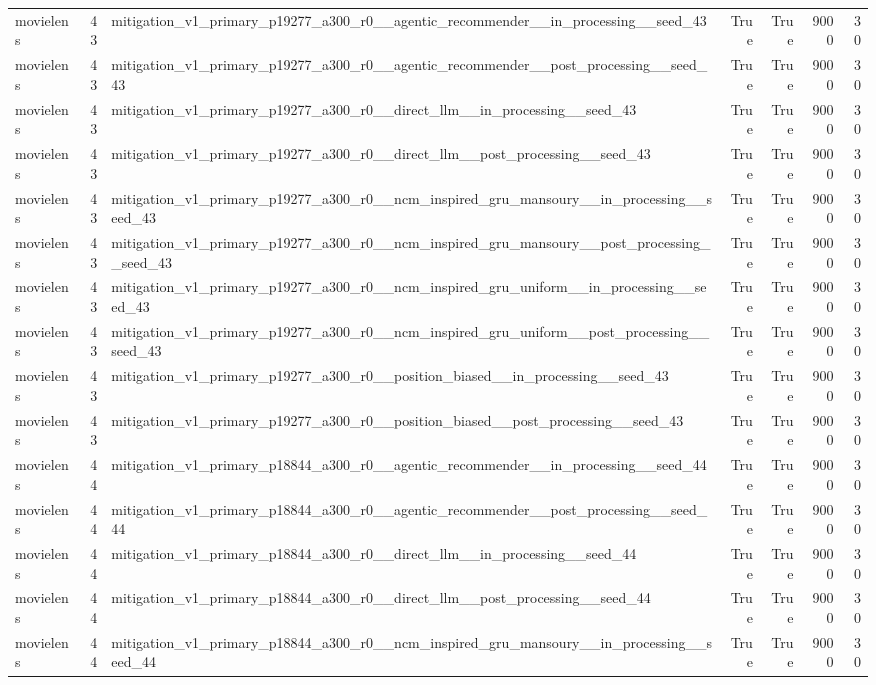 \begin{table}[htbp!]
\begin{tabular}{lrlrrrr}
movielens & 43 & mitigation\_v1\_primary\_p19277\_a300\_r0\_\_agentic\_recommender\_\_in\_processing\_\_seed\_43 & True & True & 9000 & 30 \\
movielens & 43 & mitigation\_v1\_primary\_p19277\_a300\_r0\_\_agentic\_recommender\_\_post\_processing\_\_seed\_43 & True & True & 9000 & 30 \\
movielens & 43 & mitigation\_v1\_primary\_p19277\_a300\_r0\_\_direct\_llm\_\_in\_processing\_\_seed\_43 & True & True & 9000 & 30 \\
movielens & 43 & mitigation\_v1\_primary\_p19277\_a300\_r0\_\_direct\_llm\_\_post\_processing\_\_seed\_43 & True & True & 9000 & 30 \\
movielens & 43 & mitigation\_v1\_primary\_p19277\_a300\_r0\_\_ncm\_inspired\_gru\_mansoury\_\_in\_processing\_\_seed\_43 & True & True & 9000 & 30 \\
movielens & 43 & mitigation\_v1\_primary\_p19277\_a300\_r0\_\_ncm\_inspired\_gru\_mansoury\_\_post\_processing\_\_seed\_43 & True & True & 9000 & 30 \\
movielens & 43 & mitigation\_v1\_primary\_p19277\_a300\_r0\_\_ncm\_inspired\_gru\_uniform\_\_in\_processing\_\_seed\_43 & True & True & 9000 & 30 \\
movielens & 43 & mitigation\_v1\_primary\_p19277\_a300\_r0\_\_ncm\_inspired\_gru\_uniform\_\_post\_processing\_\_seed\_43 & True & True & 9000 & 30 \\
movielens & 43 & mitigation\_v1\_primary\_p19277\_a300\_r0\_\_position\_biased\_\_in\_processing\_\_seed\_43 & True & True & 9000 & 30 \\
movielens & 43 & mitigation\_v1\_primary\_p19277\_a300\_r0\_\_position\_biased\_\_post\_processing\_\_seed\_43 & True & True & 9000 & 30 \\
movielens & 44 & mitigation\_v1\_primary\_p18844\_a300\_r0\_\_agentic\_recommender\_\_in\_processing\_\_seed\_44 & True & True & 9000 & 30 \\
movielens & 44 & mitigation\_v1\_primary\_p18844\_a300\_r0\_\_agentic\_recommender\_\_post\_processing\_\_seed\_44 & True & True & 9000 & 30 \\
movielens & 44 & mitigation\_v1\_primary\_p18844\_a300\_r0\_\_direct\_llm\_\_in\_processing\_\_seed\_44 & True & True & 9000 & 30 \\
movielens & 44 & mitigation\_v1\_primary\_p18844\_a300\_r0\_\_direct\_llm\_\_post\_processing\_\_seed\_44 & True & True & 9000 & 30 \\
movielens & 44 & mitigation\_v1\_primary\_p18844\_a300\_r0\_\_ncm\_inspired\_gru\_mansoury\_\_in\_processing\_\_seed\_44 & True & True & 9000 & 30 \\

\end{tabular}
\end{table}
